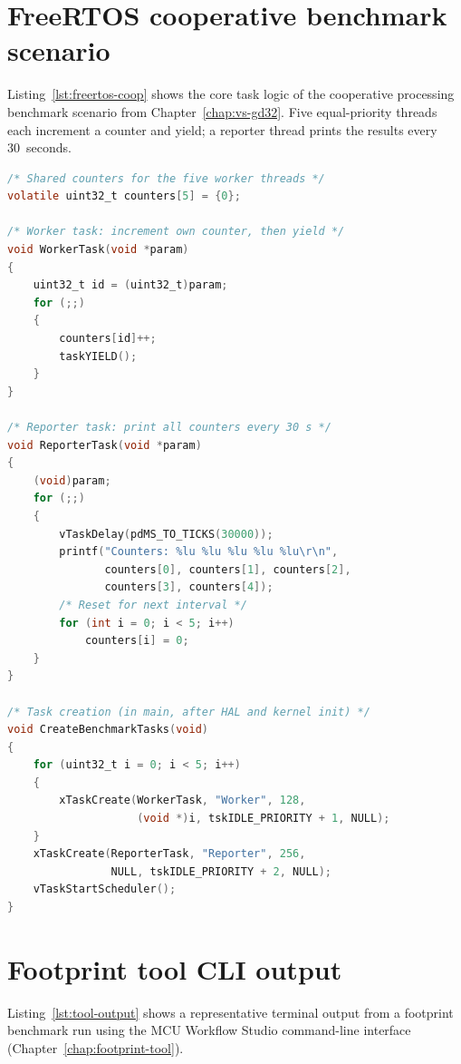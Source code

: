 \section{FreeRTOS cooperative benchmark scenario}
\label{sec:appendix-freertos-coop}

Listing~\ref{lst:freertos-coop} shows the core task logic of the cooperative processing
benchmark scenario from Chapter~\ref{chap:vs-gd32}. Five equal-priority threads each
increment a counter and yield; a reporter thread prints the results every 30~seconds.

\begin{lstlisting}[language=C, caption={FreeRTOS cooperative scenario --- task functions (STM32, simplified).}, label={lst:freertos-coop}]
/* Shared counters for the five worker threads */
volatile uint32_t counters[5] = {0};

/* Worker task: increment own counter, then yield */
void WorkerTask(void *param)
{
    uint32_t id = (uint32_t)param;
    for (;;)
    {
        counters[id]++;
        taskYIELD();
    }
}

/* Reporter task: print all counters every 30 s */
void ReporterTask(void *param)
{
    (void)param;
    for (;;)
    {
        vTaskDelay(pdMS_TO_TICKS(30000));
        printf("Counters: %lu %lu %lu %lu %lu\r\n",
               counters[0], counters[1], counters[2],
               counters[3], counters[4]);
        /* Reset for next interval */
        for (int i = 0; i < 5; i++)
            counters[i] = 0;
    }
}

/* Task creation (in main, after HAL and kernel init) */
void CreateBenchmarkTasks(void)
{
    for (uint32_t i = 0; i < 5; i++)
    {
        xTaskCreate(WorkerTask, "Worker", 128,
                    (void *)i, tskIDLE_PRIORITY + 1, NULL);
    }
    xTaskCreate(ReporterTask, "Reporter", 256,
                NULL, tskIDLE_PRIORITY + 2, NULL);
    vTaskStartScheduler();
}
\end{lstlisting}

\pagebreak

\section{Footprint tool CLI output}
\label{sec:appendix-tool-output}

Listing~\ref{lst:tool-output} shows a representative terminal output from a footprint
benchmark run using the MCU Workflow Studio command-line interface
(Chapter~\ref{chap:footprint-tool}).

